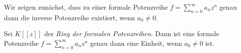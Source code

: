 %
%
%
%
%
%
%
Wir zeigen zunächst, dass zu einer formale Potenzreihe $f = \sum_{n=0}^\infty a_n z^n$ genau dann die inverse Potenzreihe existiert, wenn $a_0 \neq 0 $.
%
%
%
\begin{satz}\label{potenzreihenringEinheit}
Sei $K[[z]] $ der \textit{Ring der formalen Potenzreihen}. Dann ist eine formale Potenzreihe $f = \sum\limits_{n=0}^{\infty}a_nz^n $ genau dann eine Einheit, wenn $a_0 \neq 0$ ist.\\ 
\end{satz}
